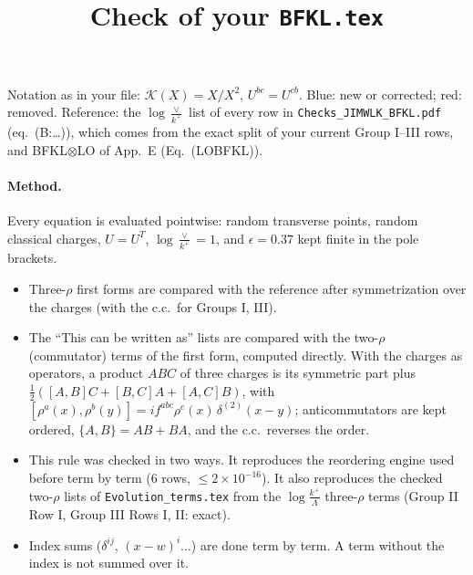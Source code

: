 \documentclass[10pt]{article}
\title{Check of your \texttt{BFKL.tex}}
\date{}
\newcommand{\new}[1]{{\color{blue}#1}}
\newcommand{\old}[1]{{\color{red}#1}}
\newcommand{\LV}{\log\frac{\vee}{k^+}}
\begin{document}
\maketitle
\noindent Notation as in your file: $\mathcal K(X)=X/X^2$, $U^{bc}=U^{cb}$. \new{Blue}: new or corrected; \old{red}: removed. Reference: the $\LV$ list of every row in \texttt{Checks\_JIMWLK\_BFKL.pdf} (eq.\ (B:\dots)), which comes from the exact split of your current Group I--III rows, and BFKL$\otimes$LO of App.~E (Eq.\ (LOBFKL)).

\paragraph{Method.} Every equation is evaluated pointwise: random transverse points, random classical charges, $U=U^T$, $\LV=1$, and $\epsilon=0.37$ kept finite in the pole brackets.
\begin{itemize}
\item Three-$\rho$ first forms are compared with the reference after symmetrization over the charges (with the c.c.\ for Groups I, III).
\item The ``This can be written as'' lists are compared with the two-$\rho$ (commutator) terms of the first form, computed directly. With the charges as operators, a product $ABC$ of three charges is its symmetric part plus $\tfrac12([A,B]C+[B,C]A+[A,C]B)$, with $[\rho^a(x),\rho^b(y)]=i f^{abc}\rho^c(x)\,\delta^{(2)}(x-y)$; anticommutators are kept ordered, $\{A,B\}=AB+BA$, and the c.c.\ reverses the order.
\item This rule was checked in two ways. It reproduces the reordering engine used before term by term (6 rows, $\le2\times10^{-16}$). It also reproduces the checked two-$\rho$ lists of \texttt{Evolution\_terms.tex} from the $\log\frac{k^+}{\Lambda}$ three-$\rho$ terms (Group II Row I, Group III Rows I, II: exact).
\item Index sums ($\delta^{ij}$, $(x-w)^i\ldots$) are done term by term. A term without the index is not summed over it.
\end{itemize}
\end{document}
